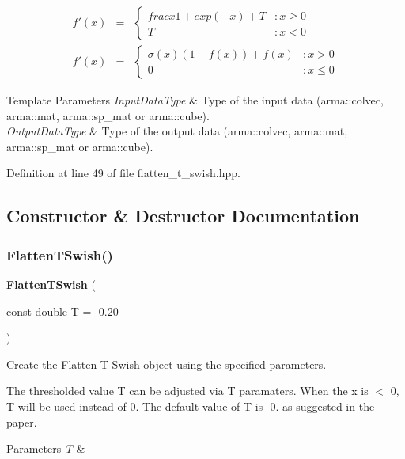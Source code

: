 \begin{eqnarray*} f'(x) &=& \left\{ \begin{array}{lr} frac{x}{1+exp(-x)} + T & : x \ge 0 \\ T & : x < 0 \end{array} \right. \\ f'(x) &=& \left\{ \begin{array}{lr} \sigma(x)(1 - f(x)) + f(x) & : x > 0 \\ 0 & : x \le 0 \end{array} \right. \end{eqnarray*}


\begin{DoxyTemplParams}{Template Parameters}
{\em Input\+Data\+Type} & Type of the input data (arma\+::colvec, arma\+::mat, arma\+::sp\+\_\+mat or arma\+::cube). \\
\hline
{\em Output\+Data\+Type} & Type of the output data (arma\+::colvec, arma\+::mat, arma\+::sp\+\_\+mat or arma\+::cube). \\
\hline
\end{DoxyTemplParams}


Definition at line 49 of file flatten\+\_\+t\+\_\+swish.\+hpp.



\subsection{Constructor \& Destructor Documentation}
\mbox{\label{classmlpack_1_1ann_1_1FlattenTSwish_a5488be0d8f8cc922148dd2925be25252}} 
\subsubsection{Flatten\+T\+Swish()}
{\footnotesize\ttfamily \textbf{ Flatten\+T\+Swish} (\begin{DoxyParamCaption}\item[{const double}]{T = {\ttfamily -\/0.20} }\end{DoxyParamCaption})}



Create the Flatten T Swish object using the specified parameters. 

The thresholded value T can be adjusted via T paramaters. When the x is $<$ 0, T will be used instead of 0. The default value of T is -\/0. as suggested in the paper. 
\begin{DoxyParams}{Parameters}
{\em T} & \\
\hline
\end{DoxyParams}


